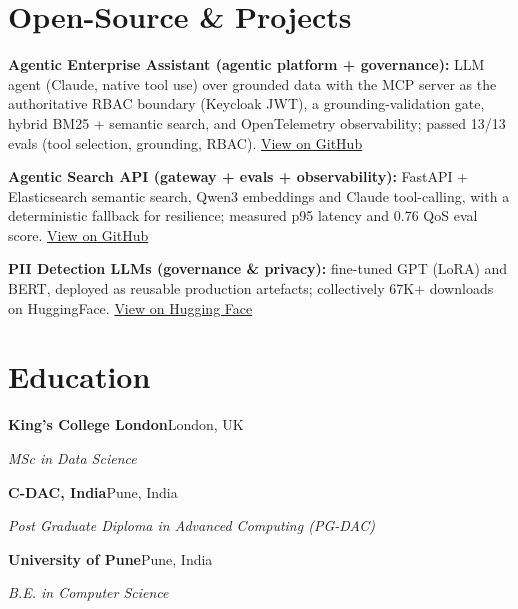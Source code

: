 \documentclass[10pt,a4paper]{article}
\begin{document}
\section{Open-Source \& Projects}
\begin{tight}
  \item \textbf{Agentic Enterprise Assistant (agentic platform + governance):} LLM agent (Claude, native tool use) over grounded data with the MCP server as the authoritative RBAC boundary (Keycloak JWT), a grounding-validation gate, hybrid BM25 + semantic search, and OpenTelemetry observability; passed 13/13 evals (tool selection, grounding, RBAC). \href{https://github.com/abhijeetscode/Agentic-Enterprise-Assistant}{View on GitHub}
  \item \textbf{Agentic Search API (gateway + evals + observability):} FastAPI + Elasticsearch semantic search, Qwen3 embeddings and Claude tool-calling, with a deterministic fallback for resilience; measured p95 latency and 0.76 QoS eval score. \href{https://github.com/abhijeetscode/search-agent}{View on GitHub}
  \item \textbf{PII Detection LLMs (governance \& privacy):} fine-tuned GPT (LoRA) and BERT, deployed as reusable production artefacts; collectively 67K+ downloads on HuggingFace. \href{https://huggingface.co/ab-ai/pii_model}{View on Hugging Face}
\end{tight}

\section{Education}
{\color{company}\bfseries King's College London}\hfill {\color{muted}London, UK}\par
{\itshape MSc in Data Science}\par\vspace{2pt}
{\color{company}\bfseries C-DAC, India}\hfill {\color{muted}Pune, India}\par
{\itshape Post Graduate Diploma in Advanced Computing (PG-DAC)}\par\vspace{2pt}
{\color{company}\bfseries University of Pune}\hfill {\color{muted}Pune, India}\par
{\itshape B.E. in Computer Science}\par
\end{document}

